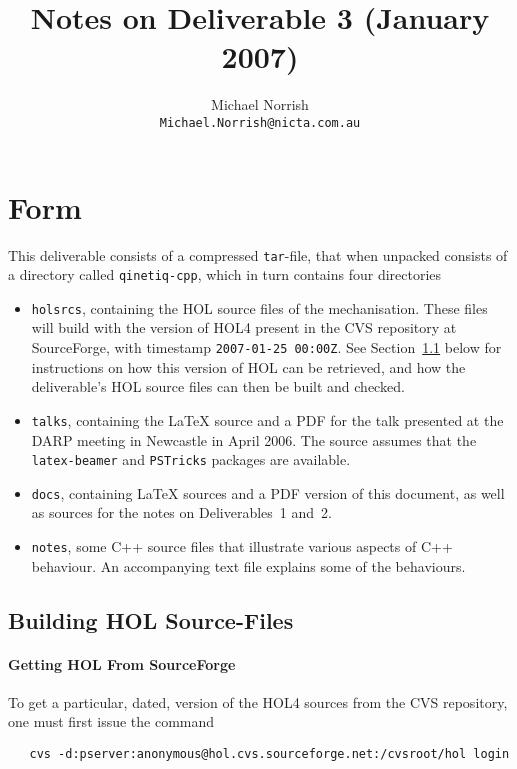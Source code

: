 \documentclass[11pt]{article}
\title{Notes on Deliverable 3 (January 2007)}
\author{Michael Norrish\\{\small \texttt{Michael.Norrish@nicta.com.au}}}
\date{}
\begin{document}
\maketitle

\section{Form}

This deliverable consists of a compressed \texttt{tar}-file, that when
unpacked consists of a directory called \texttt{qinetiq-cpp}, which in
turn contains four directories
\begin{itemize}
\item \texttt{holsrcs}, containing the HOL source files of the
  mechanisation.  These files will build with the version of HOL4
  present in the CVS repository at SourceForge, with timestamp
  \texttt{2007-01-25 00:00Z}.  See Section~\ref{sec:getting-hol}
  below for instructions on how this version of HOL can be retrieved,
  and how the deliverable's HOL source files can then be built and
  checked.
\item \texttt{talks}, containing the \LaTeX{} source and a PDF for the
  talk presented at the DARP meeting in Newcastle in April 2006.  The
  source assumes that the \texttt{latex-beamer} and \texttt{PSTricks}
  packages are available.
\item \texttt{docs}, containing \LaTeX{} sources and a PDF version of
  this document, as well as sources for the notes on Deliverables~1
  and~2.
\item \texttt{notes}, some C++ source files that illustrate various
  aspects of C++ behaviour.  An accompanying text file explains some
  of the behaviours.
\end{itemize}

\subsection{Building HOL Source-Files}
\label{sec:getting-hol}

\paragraph{Getting HOL From SourceForge}

To get a particular, dated, version of the HOL4 sources from the CVS
repository, one must first issue the command

{\small
\begin{verbatim}
   cvs -d:pserver:anonymous@hol.cvs.sourceforge.net:/cvsroot/hol login
\end{verbatim}
}
\end{document}
